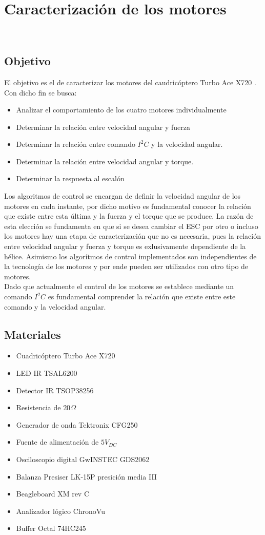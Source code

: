 \documentclass[main]{subfiles}
\begin{document}
\chapter{Caracterizaci\'on de los motores}\
\label{chap:test_motores}
\section{Objetivo}
El objetivo es el de caracterizar los motores del caudric\'optero Turbo Ace X720 . Con dicho fin se busca:

\begin{itemize}
\item Analizar el comportamiento de los cuatro motores individualmente
\item Determinar la relaci\'on entre velocidad angular y fuerza
\item Determinar la relaci\'on entre comando $I^2C$ y la velocidad angular.
\item Determinar la relaci\'on entre velocidad angular y torque.
\item Determinar la respuesta al escal\'on
\end{itemize}

Los algoritmos de control se encargan de definir la velocidad angular de los motores en cada instante, por dicho motivo es fundamental conocer la relaci\'on que existe entre esta \'ultima y la fuerza y el torque que se produce. La raz\'on de esta elecci\'on se fundamenta en que si se desea cambiar el ESC por otro o incluso los motores hay una etapa de caracterizaci\'on que no es necesaria, pues la relaci\'on entre velocidad angular y fuerza y torque es exlusivamente dependiente de la h\'elice. Asimismo los algor\'itmos de control implementados son independientes de la tecnolog\'ia de los motores y por ende pueden ser utilizados con otro tipo de motores.\\

Dado que actualmente el control de los motores se establece mediante un comando $I^2C$ es fundamental comprender la relaci\'on que existe entre este comando y la velocidad angular.

\section{Materiales}
\begin{itemize}
\item Cuadric\'optero Turbo Ace X720	
\item LED IR TSAL6200
\item Detector IR TSOP38256
\item Resistencia de $20 \Omega$
\item Generador de onda Tektronix CFG250
\item Fuente de alimentaci\'on de $5V_{DC}$
\item Osciloscopio digital GwINSTEC GDS2062
\item Balanza Presiser LK-15P presici\'on media III
\item Beagleboard XM rev C
\item Analizador l\'ogico ChronoVu
\item Buffer Octal 74HC245
\end{itemize}
\end{document}
